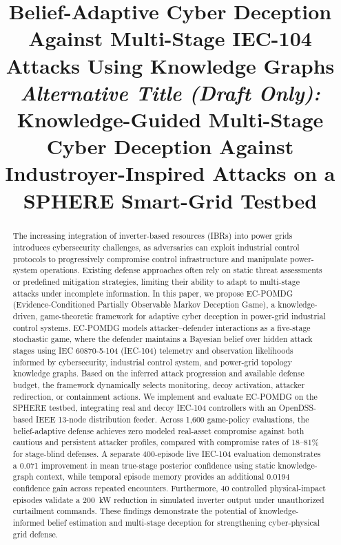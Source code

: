 \documentclass[10pt,conference]{IEEEtran}
\begin{document}
\title{
Belief-Adaptive Cyber Deception Against
Multi-Stage IEC-104 Attacks Using Knowledge Graphs
\\[0.6em]
{\normalsize
\textit{Alternative Title (Draft Only):}\\
Knowledge-Guided Multi-Stage Cyber Deception Against
Industroyer-Inspired Attacks on a SPHERE Smart-Grid Testbed
}
}
\maketitle



\begin{abstract}
The increasing integration of inverter-based resources (IBRs) into power grids introduces cybersecurity challenges, as adversaries can exploit industrial control protocols to progressively compromise control infrastructure and manipulate power-system operations. Existing defense approaches often rely on static threat assessments or predefined mitigation strategies, limiting their ability to adapt to multi-stage attacks under incomplete information. In this paper, we propose EC-POMDG (Evidence-Conditioned Partially Observable Markov Deception Game), a knowledge-driven, game-theoretic framework for adaptive cyber deception in power-grid industrial control systems. EC-POMDG models attacker--defender interactions as a five-stage stochastic game, where the defender maintains a Bayesian belief over hidden attack stages using IEC 60870-5-104 (IEC-104) telemetry and observation likelihoods informed by cybersecurity, industrial control system, and power-grid topology knowledge graphs. Based on the inferred attack progression and available defense budget, the framework dynamically selects monitoring, decoy activation, attacker redirection, or containment actions. We implement and evaluate EC-POMDG on the SPHERE testbed, integrating real and decoy IEC-104 controllers with an OpenDSS-based IEEE 13-node distribution feeder. Across 1,600 game-policy evaluations, the belief-adaptive defense achieves zero modeled real-asset compromise against both cautious and persistent attacker profiles, compared with compromise rates of 18--81\% for stage-blind defenses. A separate 400-episode live IEC-104 evaluation demonstrates a 0.071 improvement in mean true-stage posterior confidence using static knowledge-graph context, while temporal episode memory provides an additional 0.0194 confidence gain across repeated encounters. Furthermore, 40 controlled physical-impact episodes validate a 200~kW reduction in simulated inverter output under unauthorized curtailment commands. These findings demonstrate the potential of knowledge-informed belief estimation and multi-stage deception for strengthening cyber-physical grid defense.
\end{abstract}
\end{document}
